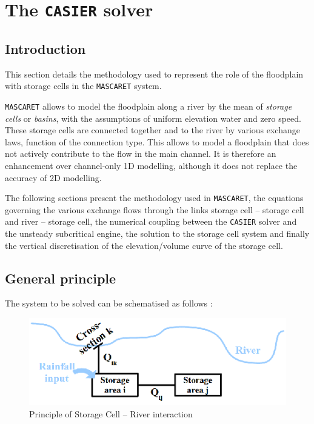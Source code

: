 \section{The \texttt{CASIER} solver}

\label{SectionCASIER}

\subsection{Introduction}

This section details the methodology used to represent the role of the floodplain with storage cells in the \texttt{MASCARET} system.

\vspace{0.5cm}

\texttt{MASCARET} allows to model the floodplain along a river by the mean of \textit{storage cells} or \textit{basins}, with the assumptions of uniform elevation water and zero speed. These storage cells are connected together and to the river by various exchange laws, function of the connection type. This allows to model a floodplain that does not actively contribute to the flow in the main channel. It is therefore an enhancement over channel-only 1D modelling, although it does not replace the accuracy of 2D modelling.

\vspace{0.5cm}

The following sections present the methodology used in \texttt{MASCARET}, the equations governing the various exchange flows through the links storage cell -- storage cell and river -- storage cell, the numerical coupling between the \texttt{CASIER} solver and the unsteady subcritical engine, the solution to the storage cell system and finally the vertical discretisation of the elevation/volume curve of the storage cell.

\vspace{0.5cm}

\subsection{General principle}

The system to be solved can be schematised as follows :

\begin{figure}[h]
    \begin{center}
     \includegraphics[scale=1.8]{Figures/CasierRiv.eps}
     \caption{Principle of Storage Cell -- River interaction}
    \end{center}
\end{figure}

